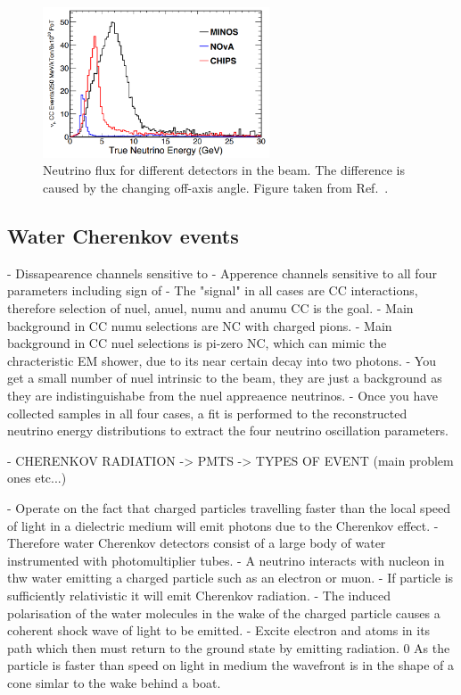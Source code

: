 \begin{figure} %
    \includegraphics[width=0.6\textwidth]{diagrams/4-chips/numi_axis.png}
    \caption[Neutrino flux for different detectors in the \numi beam.]
    {Neutrino flux for different detectors in the \numi beam.
        The difference is caused by the changing off-axis angle.
        Figure taken from Ref.~\cite{adamson2013}.}
    \label{fig:numi_axis}
\end{figure}

\subsection{Water Cherenkov events} %
\label{sec:chips_concept_cherenkov} %

- Dissapearence channels sensitive to %
- Apperence channels sensitive to all four parameters including sign of %
- The "signal" in all cases are CC interactions, therefore selection of nuel, anuel, numu and
anumu CC is the goal.
- Main background in CC numu selections are NC with charged pions.
- Main background in CC nuel selections is pi-zero NC, which can mimic the chracteristic EM
shower, due to its near certain decay into two photons.
- You get a small number of nuel intrinsic to the beam, they are just a background as they are
indistinguishabe from the nuel appreaence neutrinos.
- Once you have collected samples in all four cases, a fit is performed to the reconstructed
neutrino energy distributions to extract the four neutrino oscillation parameters.

- CHERENKOV RADIATION -> PMTS -> TYPES OF EVENT (main problem ones etc...)

- Operate on the fact that charged particles travelling faster than the local speed of light in a
dielectric medium will emit photons due to the Cherenkov effect.
- Therefore water Cherenkov detectors consist of a large body of water instrumented with
photomultiplier tubes.
- A neutrino interacts with nucleon in thw water emitting a charged particle such as an electron or
muon.
- If particle is sufficiently relativistic it will emit Cherenkov radiation.
- The induced polarisation of the water molecules in the wake of the charged particle causes a
coherent shock wave of light to be emitted.
- Excite electron and atoms in its path which then must return to the ground state by emitting
radiation.
0 As the particle is faster than speed on light in medium the wavefront is in the shape of a cone
simlar to the wake behind a boat.

